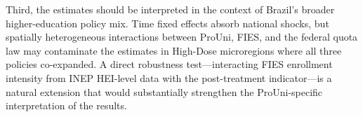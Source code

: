 Third, the estimates should be interpreted in the context of Brazil's broader higher-education policy mix. Time fixed effects absorb national shocks, but spatially heterogeneous interactions between ProUni, FIES, and the federal quota law may contaminate the estimates in High-Dose microregions where all three policies co-expanded. A direct robustness test---interacting FIES enrollment intensity from INEP HEI-level data with the post-treatment indicator---is a natural extension that would substantially strengthen the ProUni-specific interpretation of the results.
